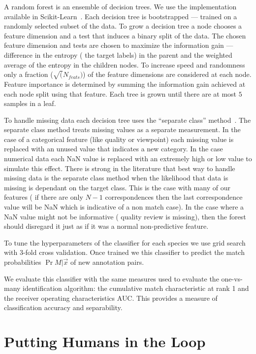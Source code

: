 A random forest is an ensemble of decision trees.
We use the implementation available in
  Scikit-Learn~\cite{pedregosa_scikit-learn_2011}.
Each decision tree is bootstrapped --- \ie{} trained on a randomly selected
  subset of the data.
To grow a decision tree a node chooses a feature dimension and a test that
  induces a binary split of the data.
The chosen feature dimension and tests are chosen to maximize the information
  gain --- \ie{} difference in the entropy (\wrt{} the target labels) in the
  parent and the weighted average of the entropy in the children nodes.
To increase speed and randomness only a fraction ($\sqrt(N_{feats})$) of the
  feature dimensions are considered at each node.
Feature importance is determined by summing the information gain achieved at
  each node split using that feature.
Each tree is grown until there are at most $5$ samples in a leaf.

To handle missing data each decision tree uses the ``separate class''
  method~\cite{ding_investigation_2010}.
The separate class method treats missing values as a separate measurement.
In the case of a categorical feature (like quality or viewpoint) each missing
  value is replaced with an unused value that indicates a new category.
In the case numerical data each NaN value is replaced with an extremely high
  or low value to simulate this effect.
There is strong in the literature that best way to handle missing data is the
  separate class method when the likelihood that data is missing is dependant on
  the target class.
This is the case with many of our features (\eg{} if there are only $N-1$
  correspondences then the last correspondence value will be NaN which is
  indicative of a non match case).
In the case where a NaN value might not be informative (\eg{} quality review
  is missing), then the forest should disregard it just as if it was a normal
  non-predictive feature.

To tune the hyperparameters of the classifier for each species we use grid
  search with $3$-fold cross validation.
Once trained we this classifier to predict the match probabilities $\Pr{M |
  \vec{x}}$ of new annotation pairs.

We evaluate this classifier with the same measures used to evaluate the
  one-vs-many identification algorithm:
the cumulative match characteristic at rank 1 and the receiver operating
  characteristics AUC{}.
This provides a measure of classification accuracy and separability.

\section{Putting Humans in the Loop}

